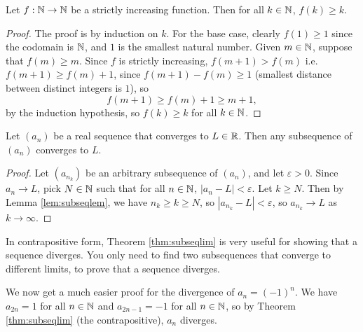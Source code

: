 \documentclass[../analysis1.tex]{subfiles}
\begin{document}
\begin{lemma}
\label{lem:subseqlem}
    \begin{shaded*}
        Let $f:\mathbb{N}\to\mathbb{N}$ be a strictly increasing function. Then for all $k\in\mathbb{N}$, $f(k)\ge k$.
    \end{shaded*}
\end{lemma}
\begin{proof}
    The proof is by induction on $k$. For the base case, clearly $f(1)\ge 1$ since the codomain is $\mathbb{N}$, and $1$ is the smallest natural number. Given $m\in\mathbb{N}$, suppose that $f(m)\ge m$.
    Since $f$ is strictly increasing, $f(m+1)>f(m)$ i.e. $f(m+1)\ge f(m)+1$, since $f(m+1)-f(m)\ge 1$ (smallest distance between distinct integers is $1$), so $$f(m+1)\ge f(m)+1\ge m+1,$$by the induction hypothesis, so $f(k)\ge k$ for all $k\in\mathbb{N}$. \qedhere
\end{proof}

\begin{theorem}
\label{thm:subseqlim}
    \begin{shaded*}
        Let $(a_n)$ be a real sequence that converges to $L\in\mathbb{R}$. Then any subsequence of $(a_n)$ converges to $L$.
    \end{shaded*}
\end{theorem}
\begin{proof}
    Let $(a_{n_k})$ be an arbitrary subsequence of $(a_n)$, and let $\varepsilon>0$.
    Since $a_n\to L$, pick $N\in\mathbb{N}$ such that for all $n\in\mathbb{N}$, $|a_n-L|<\varepsilon$. Let $k\ge N$. Then by Lemma \ref{lem:subseqlem}, we have $n_k\ge k\ge N$, so $|a_{n_k}-L|<\varepsilon$, so $a_{n_k}\to L$ as $k\to\infty$.\qedhere
\end{proof}
\begin{remark}
    In contrapositive form, Theorem \ref{thm:subseqlim} is very useful for showing that a sequence diverges. You only need to find two subsequences that converge to different limits, to prove that a sequence diverges.
\end{remark}
\begin{example}
    We now get a much easier proof for the divergence of $a_n=(-1)^n$. We have $a_{2n}=1$ for all $n\in\mathbb{N}$ and $a_{2n-1}=-1$ for all $n\in\mathbb{N}$, so by Theorem \ref{thm:subseqlim} (the contrapositive), $a_n$ diverges. 
\end{example}
\end{document}
